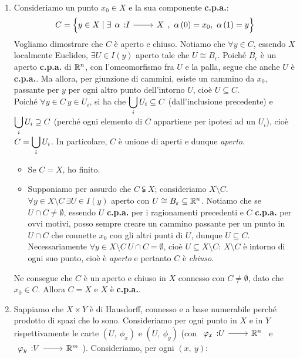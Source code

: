 \begin{demonstration}~{}
	\begin{enumerate}[label=\Roman*]
		\item Consideriamo un punto $x_0\in X$ e la sua componente \textbf{c.p.a.}:
		\begin{equation*}
			C=\left\{y\in X\mid \exists \funz{\alpha}{I}{X},\ \alpha\left(0\right)=x_0,\ \alpha\left(1\right)=y\right\}
		\end{equation*}
		Vogliamo dimostrare che $C$ è aperto e chiuso. Notiamo che $\forall y\in C$, essendo $X$ localmente Euclideo, $\exists U\in I\left(y\right)$ aperto tale che $U\cong B_\epsilon$. Poiché $B_\epsilon$ è un aperto \textbf{c.p.a.} di $\mathbb{R}^n$, con l'omeomorfismo fra $U$ e la palla, segue che anche $U$ è \textbf{c.p.a.}. Ma allora, per giunzione di cammini, esiste un cammino da $x_0$, passante per $y$ per ogni altro punto dell'intorno $U$, cioè $U\subseteq C$.\\
		Poiché $\forall y\in C\ y\in U_i$, si ha che $\displaystyle \mathop{{\bigcup}}\displaylimits_i U_i\subseteq C$ (dall'inclusione precedente) e  $\displaystyle\mathop{{\bigcup}}\displaylimits_i U_i\supseteq C$ (perché ogni elemento di $C$ appartiene per ipotesi ad un $U_i$), cioè $\displaystyle C=\mathop{{\bigcup}}\displaylimits_i U_i$. In particolare, $C$ è unione di aperti e dunque \textit{aperto}.
		\begin{itemize}
			\item Se $C=X$, ho finito.
			\item Supponiamo per assurdo che $C\subsetneqq X$; consideriamo $X\setminus C$. $\forall y\in X\setminus C\ \exists U\in I\left(y\right)$ aperto con $U\cong B_\varepsilon\subseteq \mathbb{R}^n$. Notiamo che se $U\cap C\neq \emptyset$, essendo $U$ \textbf{c.p.a.} per i ragionamenti precedenti e $C$ \textbf{c.p.a.} per ovvi motivi, posso sempre creare un cammino passante per un punto in $U\cap C$ che connette $x_0$ con gli altri punti di $U$, dunque $U\subseteq C$. Necessariamente $\forall y\in X\setminus C\ U\cap C=\emptyset$, cioè $U\subseteq X\setminus C$: $X\setminus C$ è intorno di ogni suo punto, cioè è \textit{aperto} e pertanto $C$ è \textit{chiuso}.
		\end{itemize}
			Ne consegue che $C$ è un aperto e chiuso in $X$ connesso con $C\neq \emptyset$, dato che $x_0\in C$. Allora $C=X$ e $X$ è \textbf{c.p.a.}.
		\item Sappiamo che $X\times Y$ è di Hausdorff, connesso e a base numerabile perché prodotto di spazi che lo sono. Consideriamo per ogni punto in $X$ e in $Y$ rispettivamente le carte $\left(U,\ \phi_x\right)$ e $\left(U,\ \phi_y\right)$ (con $\funz{\phi_x}{U}{\realset^n}$ e $\funz{\phi_y}{V}{\realset^m}$). Consideriamo, per ogni $\left(x,\ y\right)$:

\end{enumerate}
\end{demonstration}
